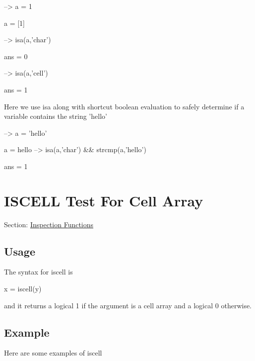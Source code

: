 \begin{DoxyVerbInclude}
--> a = {1}

a = 
 [1] 

--> isa(a,'char')

ans = 
 0 

--> isa(a,'cell')

ans = 
 1 
\end{DoxyVerbInclude}


Here we use {\ttfamily isa} along with shortcut boolean evaluation to safely determine if a variable contains the string {\ttfamily 'hello'}


\begin{DoxyVerbInclude}
--> a = 'hello'

a = 
hello
--> isa(a,'char') && strcmp(a,'hello')

ans = 
 1 
\end{DoxyVerbInclude}
 \hypertarget{inspection_iscell}{}\section{I\-S\-C\-E\-L\-L Test For Cell Array}\label{inspection_iscell}
Section\-: \hyperlink{sec_inspection}{Inspection Functions} \hypertarget{vtkwidgets_vtkxyplotwidget_Usage}{}\subsection{Usage}\label{vtkwidgets_vtkxyplotwidget_Usage}
The syntax for {\ttfamily iscell} is \begin{DoxyVerb}   x = iscell(y)
\end{DoxyVerb}
 and it returns a logical 1 if the argument is a cell array and a logical 0 otherwise. \hypertarget{variables_struct_Example}{}\subsection{Example}\label{variables_struct_Example}
Here are some examples of {\ttfamily iscell}


